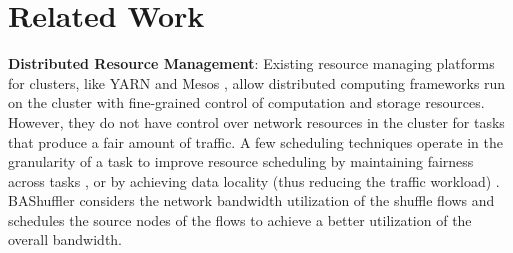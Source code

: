 \documentclass[10pt,journal,compsoc]{IEEEtran}
\begin{document}
%
%
%





\section{Related Work}\label{section:relatedwork}
\textbf{Distributed Resource Management}:
Existing resource managing platforms for clusters, like YARN
\cite{vavilapalli2013apache} and Mesos \cite{hindman2011mesos},
allow distributed computing frameworks run on the cluster with
fine-grained control of computation and storage resources.
However, they do not have control over network resources in the cluster for
tasks that produce a fair amount of traffic.
A few scheduling techniques operate in the granularity of a task to improve
resource scheduling by maintaining fairness across tasks
\cite{zaharia2010delay, isard2009quincy},
or by achieving data locality (thus reducing the traffic workload)
\cite{dean2008mapreduce, zaharia2008improving,faraz2014shufflewatcher}.
BAShuffler considers the network bandwidth utilization of the shuffle
flows and schedules the source nodes of the flows to achieve a better
utilization of the overall bandwidth.
\end{document}
